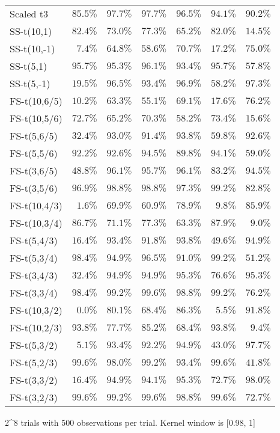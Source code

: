 \begin{longtable}{lrrrrrr}
Scaled t3 & $85.5\%$ & $97.7\%$ & $97.7\%$ & $96.5\%$ & $94.1\%$ & $90.2\%$ \\ 
SS-t(10,1) & $82.4\%$ & $73.0\%$ & $77.3\%$ & $65.2\%$ & $82.0\%$ & $14.5\%$ \\ 
SS-t(10,-1) & $7.4\%$ & $64.8\%$ & $58.6\%$ & $70.7\%$ & $17.2\%$ & $75.0\%$ \\ 
SS-t(5,1) & $95.7\%$ & $95.3\%$ & $96.1\%$ & $93.4\%$ & $95.7\%$ & $57.8\%$ \\ 
SS-t(5,-1) & $19.5\%$ & $96.5\%$ & $93.4\%$ & $96.9\%$ & $58.2\%$ & $97.3\%$ \\ 
FS-t(10,6/5) & $10.2\%$ & $63.3\%$ & $55.1\%$ & $69.1\%$ & $17.6\%$ & $76.2\%$ \\ 
FS-t(10,5/6) & $72.7\%$ & $65.2\%$ & $70.3\%$ & $58.2\%$ & $73.4\%$ & $15.6\%$ \\ 
FS-t(5,6/5) & $32.4\%$ & $93.0\%$ & $91.4\%$ & $93.8\%$ & $59.8\%$ & $92.6\%$ \\ 
FS-t(5,5/6) & $92.2\%$ & $92.6\%$ & $94.5\%$ & $89.8\%$ & $94.1\%$ & $59.0\%$ \\ 
FS-t(3,6/5) & $48.8\%$ & $96.1\%$ & $95.7\%$ & $96.1\%$ & $83.2\%$ & $94.5\%$ \\ 
FS-t(3,5/6) & $96.9\%$ & $98.8\%$ & $98.8\%$ & $97.3\%$ & $99.2\%$ & $82.8\%$ \\ 
FS-t(10,4/3) & $1.6\%$ & $69.9\%$ & $60.9\%$ & $78.9\%$ & $9.8\%$ & $85.9\%$ \\ 
FS-t(10,3/4) & $86.7\%$ & $71.1\%$ & $77.3\%$ & $63.3\%$ & $87.9\%$ & $9.0\%$ \\ 
FS-t(5,4/3) & $16.4\%$ & $93.4\%$ & $91.8\%$ & $93.8\%$ & $49.6\%$ & $94.9\%$ \\ 
FS-t(5,3/4) & $98.4\%$ & $94.9\%$ & $96.5\%$ & $91.0\%$ & $99.2\%$ & $51.2\%$ \\ 
FS-t(3,4/3) & $32.4\%$ & $94.9\%$ & $94.9\%$ & $95.3\%$ & $76.6\%$ & $95.3\%$ \\ 
FS-t(3,3/4) & $98.4\%$ & $99.2\%$ & $99.6\%$ & $98.8\%$ & $99.2\%$ & $76.2\%$ \\ 
FS-t(10,3/2) & $0.0\%$ & $80.1\%$ & $68.4\%$ & $86.3\%$ & $5.5\%$ & $91.8\%$ \\ 
FS-t(10,2/3) & $93.8\%$ & $77.7\%$ & $85.2\%$ & $68.4\%$ & $93.8\%$ & $9.4\%$ \\ 
FS-t(5,3/2) & $5.1\%$ & $93.4\%$ & $92.2\%$ & $94.9\%$ & $43.0\%$ & $97.7\%$ \\ 
FS-t(5,2/3) & $99.6\%$ & $98.0\%$ & $99.2\%$ & $93.4\%$ & $99.6\%$ & $41.8\%$ \\ 
FS-t(3,3/2) & $16.4\%$ & $94.9\%$ & $94.1\%$ & $95.3\%$ & $72.7\%$ & $98.0\%$ \\ 
FS-t(3,2/3) & $99.6\%$ & $99.2\%$ & $99.6\%$ & $98.8\%$ & $99.6\%$ & $72.7\%$ \\ 
\bottomrule
\end{longtable}
\begin{minipage}{\linewidth}
2\textasciicircum{}8 trials with 500 observations per trial. Kernel window is [0.98, 1]\\
\end{minipage}

